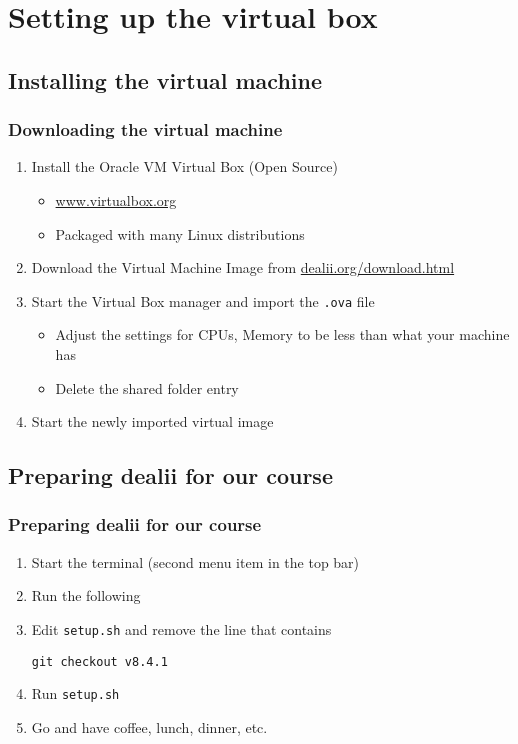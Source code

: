 \section[Virtual Box]{Setting up the virtual box}

\subsection{Installing the virtual machine}
\begin{frame}
  \frametitle{Downloading the virtual machine}
  \begin{enumerate}
  \item Install the Oracle VM Virtual Box (Open Source)
    \begin{itemize}
    \item \url{www.virtualbox.org}
    \item Packaged with many Linux distributions
    \end{itemize}
    \item Download the Virtual Machine Image from \url{dealii.org/download.html}
    \item Start the Virtual Box manager and import the \texttt{.ova} file
      \begin{itemize}
      \item Adjust the settings for CPUs, Memory to be less than what
        your machine has
      \item Delete the shared folder entry
      \end{itemize}
    \item Start the newly imported virtual image
  \end{enumerate}
\end{frame}

\subsection{Preparing dealii for our course}
\begin{frame}
  \frametitle{Preparing dealii for our course}
  \begin{enumerate}
  \item Start the terminal (second menu item in the top bar)
  \item Run the following
    \begin{block}{}
            
    \end{block}
  \item Edit \lstinline!setup.sh! and remove the line that contains
    \begin{block}{}
      \lstinline!git checkout v8.4.1!
    \end{block}
    \item Run \lstinline!setup.sh! 
  \item Go and have coffee, lunch, dinner, etc.
  \end{enumerate}
\end{frame}

